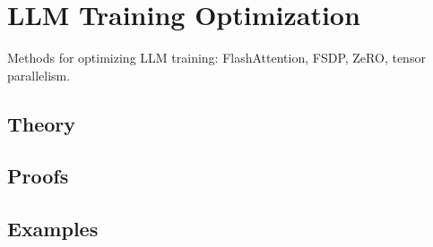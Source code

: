 
\section{LLM Training Optimization}
\label{sec:2.5.06-llm-training-optimization}

\begin{ticket}
Methods for optimizing LLM training: FlashAttention, FSDP, ZeRO, tensor parallelism.
\end{ticket}

\subsection*{Theory}

\subsection*{Proofs}

\subsection*{Examples}
